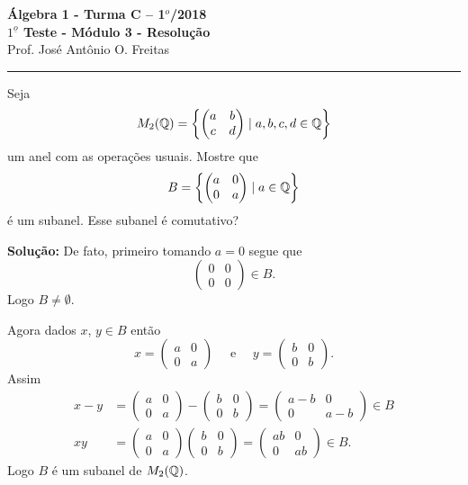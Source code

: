 \documentclass[12pt]{article}
\begin{document}


\begin{center}
{\Large\bf {\'A}lgebra 1 - Turma C -- 1$^{o}$/2018} \\ \vspace{9pt} {\large\bf
  $1^{\underline{o}}$ Teste  - M\'odulo 3 - Resolu\c{c}\~ao}\\
\vspace{9pt} Prof. Jos{\'e} Ant{\^o}nio O. Freitas
\end{center}
\hrule

\vspace{.6cm}

\questao Seja
\[
	M_2(\mathbb{Q}) = \left\{ \begin{pmatrix}
		a & b\\c & d
	\end{pmatrix} \mid a,b,c,d \in \mathbb{Q}\right\}
\]
um anel com as opera\c{c}\~oes usuais. Mostre que
\[
	B = \left\{ \begin{pmatrix}
		a & 0\\0 & a
	\end{pmatrix} \mid a \in \mathbb{Q}\right\}	
\]
\'e um subanel. Esse subanel \'e comutativo?

\noindent\textbf{Solu\c{c}\~ao:} De fato, primeiro tomando $a = 0$ segue que
\[
	\begin{pmatrix}
		0 & 0\\0 & 0
	\end{pmatrix} \in B.
\]
Logo $B \ne \emptyset$.

Agora dados $x$, $y \in B$ ent\~ao
\[
	x = \begin{pmatrix}
		a & 0\\0 & a
	\end{pmatrix}\quad \mbox{ e } \quad y = \begin{pmatrix}
		b & 0\\0 & b
	\end{pmatrix}.
\]
Assim
\begin{align*}
	x - y &= \begin{pmatrix}
		a & 0\\0 & a
	\end{pmatrix} - \begin{pmatrix}
		b & 0\\0 & b
	\end{pmatrix} = \begin{pmatrix}
		a - b & 0\\0 & a - b
	\end{pmatrix} \in B\\
	xy &= \begin{pmatrix}
		a & 0\\0 & a
	\end{pmatrix}\begin{pmatrix}
		b & 0\\0 & b
	\end{pmatrix} = \begin{pmatrix}
		ab & 0\\0 & ab
	\end{pmatrix} \in B.
\end{align*}
Logo $B$ \'e um subanel de $M_2(\mathbb{Q})$.
\end{document}
